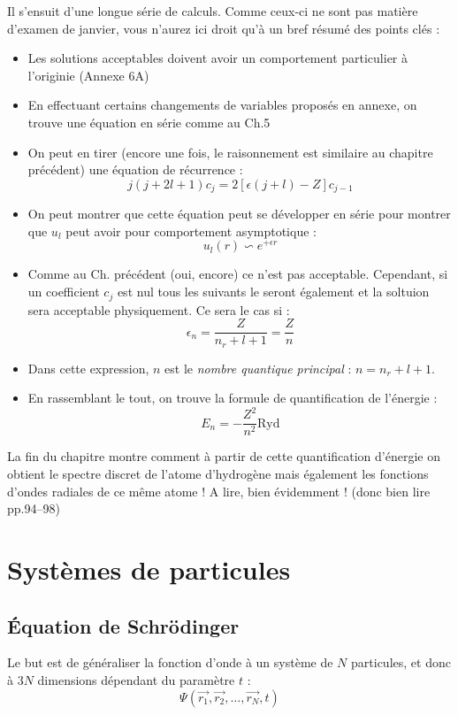 \documentclass	[11pt, a4paper, openany]{book}
\begin{document}
Il s'ensuit d'une longue série de calculs. Comme ceux-ci ne sont pas matière d'examen de janvier, vous n'aurez ici droit qu'à un bref résumé des points clés :
\begin{itemize}
\item Les solutions acceptables doivent avoir un comportement particulier à l'originie (Annexe 6A)
\item En effectuant certains changements de variables proposés en annexe, on trouve une équation en série comme au Ch.5
\item On peut en tirer (encore une fois, le raisonnement est similaire au chapitre précédent) une équation de récurrence :
\begin{equation}
j(j+2l+1)c_j = 2[\epsilon(j+l) - Z]c_{j-1}
\end{equation}
\item On peut montrer que cette équation peut se développer en série pour montrer que $u_l$ peut avoir pour comportement asymptotique : 
\begin{equation}
u_l(r) \backsim e^{+\epsilon r}
\end{equation}
\item Comme au Ch. précédent (oui, encore) ce n'est pas acceptable. Cependant, si un coefficient $c_j$ est nul tous les suivants le seront également et la soltuion sera acceptable physiquement. Ce sera le cas si :
\begin{equation}
\epsilon_n = \frac{Z}{n_r + l + 1} = \frac{Z}{n}
\end{equation}
\item Dans cette expression, $n$ est le \textit{nombre quantique principal} : $n = n_r + l + 1$.
\item En rassemblant le tout, on trouve la formule de quantification de l'énergie :
\begin{equation}
E_n = -\frac{Z^2}{n^2} \text{Ryd}
\end{equation}
\end{itemize}
La fin du chapitre montre comment à partir de cette quantification d'énergie on obtient le spectre discret de l'atome d'hydrogène mais également les fonctions d'ondes radiales de ce même atome ! A lire, bien évidemment ! (donc bien lire pp.94--98)



\chapter{Systèmes de particules}
\section{Équation de Schrödinger}
Le but est de généraliser la fonction d'onde à un système de $N$ particules, et donc à $3N$ dimensions dépendant du paramètre $t$ :
\begin{equation}
\Psi(\vec{r_1}, \vec{r_2}, \dots, \vec{r_N}, t)
\end{equation}
\end{document}
